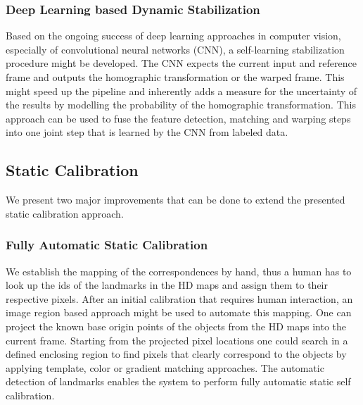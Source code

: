 \subsubsection{Deep Learning based Dynamic Stabilization}
Based on the ongoing success of deep learning approaches in computer vision, especially of convolutional neural networks (CNN), a self-learning stabilization procedure might be developed.
The CNN expects the current input and reference frame and outputs the homographic transformation or the warped frame. 
This might speed up the pipeline and inherently adds a measure for the uncertainty of the results by modelling the probability of the homographic transformation.
This approach can be used to fuse the feature detection, matching and warping steps into one joint step that is learned by the CNN from labeled data.


\subsection{Static Calibration}
We present two major improvements that can be done to extend the presented static calibration approach.

\subsubsection{Fully Automatic Static Calibration}
\label{sec:auto_mapping_landmarks}
We establish the mapping of the correspondences by hand, thus a human has to look up the ids of the landmarks in the HD maps and assign them to their respective pixels.
After an initial calibration that requires human interaction, an image region based approach might be used to automate this mapping.
One can project the known base origin points of the objects from the HD maps into the current frame.
Starting from the projected pixel locations one could search in a defined enclosing region to find pixels that clearly correspond to the objects by applying template, color or gradient matching approaches.
The automatic detection of landmarks enables the system to perform fully automatic static self calibration.

